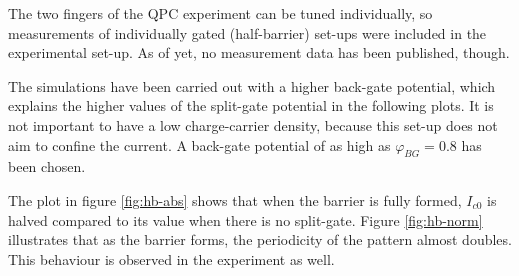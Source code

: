 The two fingers of the QPC experiment can be tuned individually, so measurements of individually gated (half-barrier) set-ups  were included in the experimental set-up. As of yet, no measurement data has been published, though.

The simulations have been carried out with a higher back-gate potential, which explains the higher values of the split-gate potential in the following plots. It is not important to have a low charge-carrier density, because this set-up does not aim to confine the current. A back-gate potential of as high as $\varphi_{BG} = 0.8$ has been chosen.

The plot in figure \ref{fig:hb-abs} shows that when the barrier is fully formed, $I_{c0}$ is halved compared to its value when there is no split-gate. Figure \ref{fig:hb-norm} illustrates that as the barrier forms, the periodicity of the pattern almost doubles. This behaviour is observed in the experiment as well.

